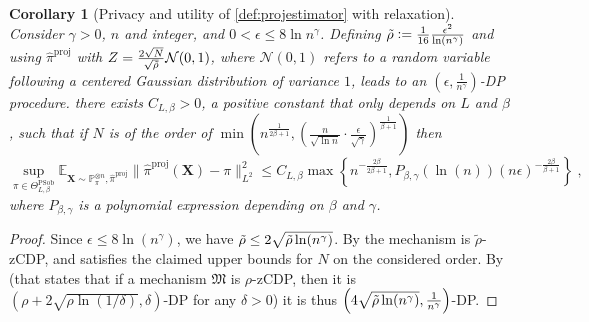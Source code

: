 \documentclass[10pt]{article} %
\newtheorem{corollary}{Corollary}
\newcommand{\Prob}[0]{\mathbb{P}}
\newcommand{\E}[0]{\mathbb{E}}
\newcommand{\eqdef}{\vcentcolon=}
\newcommand\mech[1]{\mathfrak{#1}}
\newcommand\vect[1]{\mathbf{#1}}
\newcommand\p[1]{\left( {#1}\right)}
\newcommand\RG[1]{\textcolor{red}{#1}}
\newcommand\mRG[1]{\marginpar{\tiny\RG{#1}}}
\newcommand\CL[1]{\textcolor{blue}{#1}}
\begin{document}
\begin{corollary}[Privacy and utility of \eqref{def:projestimator} with relaxation] 
\label{proposition:relaxation}
Consider $\gamma>0$, $n$ and integer, and $0<\epsilon \leq 8 \ln n^\gamma$.
Defining $\Tilde{\rho} \eqdef \frac{1}{16} \frac{\epsilon^2}{\ln\p{n^\gamma}}$
and using $\hat{\pi}^{\text{proj}}$ with $Z = \frac{2 \sqrt{N}}{\sqrt{\Tilde{\rho}}}\mathcal{N}(0, 1)$, 
where $\mathcal{N}(0, 1)$ refers to a random variable following a centered Gaussian distribution of variance $1$, 
leads to an $\p{\epsilon, \frac{1}{n^\gamma}}$-DP procedure. %
there exists $C_{L, \beta} > 0$, a positive constant that only depends on $L$ and $\beta$, such that if $N$ is of the order of  
%
$\min\p{n^{\frac{1}{2 \beta + 1}}, \p{\frac{n}{\sqrt{\ln n}} \cdot \frac{\epsilon}{\sqrt{\gamma}}}^{\frac{1}{\beta+1}}}$
then
\begin{equation*}
\sup_{\pi \in \Theta^{\text{PSob}}_{L, \beta}}
    \E_{\vect{X} \sim \Prob_{\pi}^{\otimes n}, \hat{\pi}^{\text{proj}}} \| \hat{\pi}^{\text{proj}}(\vect{X}) - \pi \|_{L^2}^2
    \leq C_{L, \beta}  \max \left\{ n^{-\frac{2 \beta}{2 \beta + 1}}, P_{\beta, \gamma}(\ln(n)) (n \epsilon)^{-\frac{2 \beta}{ \beta + 1}} \right\} \;,
\end{equation*}
where $P_{\beta, \gamma}$ is a polynomial expression depending on $\beta$ and $\gamma$.
\end{corollary}
\begin{proof}
    Since $\epsilon \leq 8 \ln\p{n^\gamma}$, we have $\Tilde{\rho} \leq 2 \sqrt{ \Tilde{\rho} \ln(n^\gamma)}$. By  the mechanism is $\tilde{\rho}$-zCDP, and satisfies the claimed upper bounds for $N$ on the considered order. By \citet{bun2016concentrated} (that states that if a mechanism $\mech{M}$ is $\rho$-zCDP, then it is $\p{\rho + 2 \sqrt{ \rho \ln(1/\delta)}, \delta}$-DP for any $\delta > 0$) it is thus
    $\p{4 \sqrt{ \Tilde{\rho} \ln(n^{\gamma})},  \frac{1}{n^\gamma}}$-DP.
\end{proof}
\end{document}
